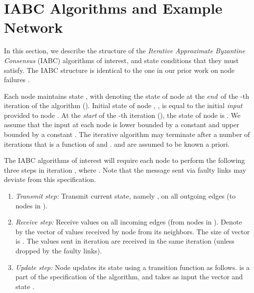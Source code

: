 \documentclass{llncs}
\begin{document}
\section{IABC Algorithms and Example Network}
\label{sec:iacbl}

In this section, we describe the structure of the
{\em Iterative Approximate Byzantine Consensus} (IABC) algorithms of interest, and state conditions that they must satisfy. The IABC structure is identical to the one in our prior work on node failures \cite{vaidya_PODC12,Tseng_general,vaidya_icdcn14}.

Each node  maintains state , with  denoting the state
of node  at the {\em end}\, of the -th iteration of the algorithm ().
Initial state of node , , is equal to the initial {\em input}\, provided to node . At the {\em start} of the -th iteration (), the state of
node  is . We assume that the input at each node is lower bounded by a constant  and upper bounded by a constant . The
iterative algorithm may terminate after a number of iterations that is a function of  and .  and  are assumed to be known a priori. 

The IABC algorithms of interest will require each node 
to perform the following three steps in iteration , where .
Note that the message sent via faulty links may deviate from this specification.

\begin{enumerate}
\item {\em Transmit step:} Transmit current state, namely , on all outgoing edges
 (to nodes in ).

\item {\em Receive step:} Receive values on all incoming edges (from nodes in ). 
Denote by  the vector of values received by node  from its
neighbors. The size of vector  is . The values sent in iteration  are received in the same iteration (unless dropped by the faulty links).

\item {\em Update step:} Node  updates its state using a transition function  as
follows.  is a part of the specification of the algorithm, and takes
as input the vector  and state .




\end{enumerate}

~
\end{document}
